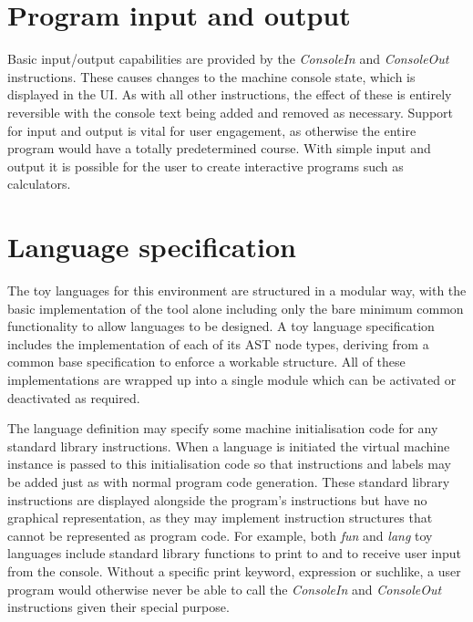 \section{Program input and output}

Basic input/output capabilities are provided by the \textit{ConsoleIn} and \textit{ConsoleOut} instructions. These causes changes to the machine console state, which is displayed in the UI. As with all other instructions, the effect of these is entirely reversible with the console text being added and removed as necessary. Support for input and output is vital for user engagement, as otherwise the entire program would have a totally predetermined course. With simple input and output it is possible for the user to create interactive programs such as calculators.

\section{Language specification}

The toy languages for this environment are structured in a modular way, with the basic implementation of the tool alone including only the bare minimum common functionality to allow languages to be designed. A toy language specification includes the implementation of each of its AST node types, deriving from a common base specification to enforce a workable structure. All of these implementations are wrapped up into a single module which can be activated or deactivated as required.

The language definition may specify some machine initialisation code for any standard library instructions. When a language is initiated the virtual machine instance is passed to this initialisation code so that instructions and labels may be added just as with normal program code generation. These standard library instructions are displayed alongside the program's instructions but have no graphical representation, as they may implement instruction structures that cannot be represented as program code. For example, both \textit{fun} and \textit{lang} toy languages include standard library functions to print to and to receive user input from the console. Without a specific print keyword, expression or suchlike, a user program would otherwise never be able to call the \textit{ConsoleIn} and \textit{ConsoleOut} instructions given their special purpose.

